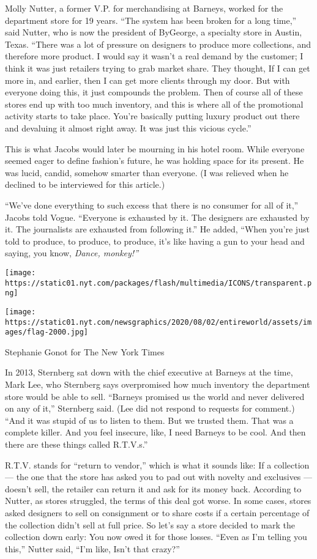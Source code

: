 Molly Nutter, a former V.P. for merchandising at Barneys, worked for the
department store for 19 years. ``The system has been broken for a long
time,'' said Nutter, who is now the president of ByGeorge, a specialty
store in Austin, Texas. ``There was a lot of pressure on designers to
produce more collections, and therefore more product. I would say it
wasn't a real demand by the customer; I think it was just retailers
trying to grab market share. They thought, If I can get more in, and
earlier, then I can get more clients through my door. But with everyone
doing this, it just compounds the problem. Then of course all of these
stores end up with too much inventory, and this is where all of the
promotional activity starts to take place. You're basically putting
luxury product out there and devaluing it almost right away. It was just
this vicious cycle.''

This is what Jacobs would later be mourning in his hotel room. While
everyone seemed eager to define fashion's future, he was holding space
for its present. He was lucid, candid, somehow smarter than everyone. (I
was relieved when he declined to be interviewed for this article.)

``We've done everything to such excess that there is no consumer for all
of it,'' Jacobs told Vogue. ``Everyone is exhausted by it. The designers
are exhausted by it. The journalists are exhausted from following it.''
He added, ``When you're just told to produce, to produce, to produce,
it's like having a gun to your head and saying, you know, \emph{Dance,
monkey!''}

\texttt{[image: https://static01.nyt.com/packages/flash/multimedia/ICONS/transparent.png]}

\texttt{[image: https://static01.nyt.com/newsgraphics/2020/08/02/entireworld/assets/images/flag-2000.jpg]}

Stephanie Gonot for The New York Times

In 2013, Sternberg sat down with the chief executive at Barneys at the
time, Mark Lee, who Sternberg says overpromised how much inventory the
department store would be able to sell. ``Barneys promised us the world
and never delivered on any of it,'' Sternberg said. (Lee did not respond
to requests for comment.) ``And it was stupid of us to listen to them.
But we trusted them. That was a complete killer. And you feel insecure,
like, I need Barneys to be cool. And then there are these things called
R.T.V.s.''

R.T.V. stands for ``return to vendor,'' which is what it sounds like: If
a collection --- the one that the store has asked you to pad out with
novelty and exclusives --- doesn't sell, the retailer can return it and
ask for its money back. According to Nutter, as stores struggled, the
terms of this deal got worse. In some cases, stores asked designers to
sell on consignment or to share costs if a certain percentage of the
collection didn't sell at full price. So let's say a store decided to
mark the collection down early: You now owed it for those losses. ``Even
as I'm telling you this,'' Nutter said, ``I'm like, Isn't that crazy?''

